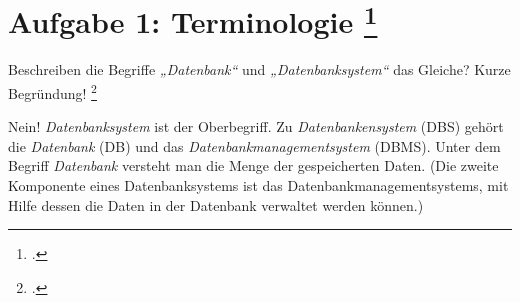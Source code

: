 \documentclass{lehramt-informatik-aufgabe}
\begin{document}

\section{Aufgabe 1: Terminologie
\footcite[Seite 1]{db:ab:1}}

\noindent
Beschreiben die Begriffe \emph{„Datenbank“} und \emph{„Datenbanksystem“}
das Gleiche? Kurze Begründung!
\footcite[13]{winter}

\begin{liAntwort}
Nein! \emph{Datenbanksystem} ist der Oberbegriff. Zu
\emph{Datenbankensystem} (DBS) gehört die \emph{Datenbank} (DB) und das
\emph{Datenbankmanagementsystem} (DBMS). Unter dem Begriff
\emph{Datenbank} versteht man die Menge der gespeicherten Daten.
(Die zweite
Komponente eines Datenbanksystems ist das Datenbankmanagementsystems,
mit Hilfe dessen die Daten in der Datenbank verwaltet werden können.)
\end{liAntwort}
\end{document}
